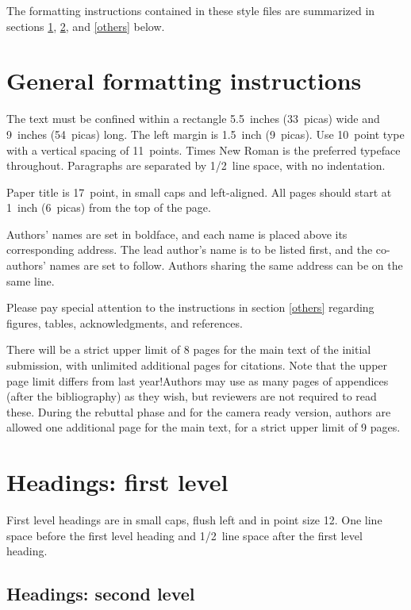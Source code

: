\documentclass{article} %
\begin{document}
The formatting instructions contained in these style files are summarized in
sections \ref{gen_inst}, \ref{headings}, and \ref{others} below.

\section{General formatting instructions}
\label{gen_inst}

The text must be confined within a rectangle 5.5~inches (33~picas) wide and
9~inches (54~picas) long. The left margin is 1.5~inch (9~picas).
Use 10~point type with a vertical spacing of 11~points. Times New Roman is the
preferred typeface throughout. Paragraphs are separated by 1/2~line space,
with no indentation.

Paper title is 17~point, in small caps and left-aligned.
All pages should start at 1~inch (6~picas) from the top of the page.

Authors' names are
set in boldface, and each name is placed above its corresponding
address. The lead author's name is to be listed first, and
the co-authors' names are set to follow. Authors sharing the
same address can be on the same line.

Please pay special attention to the instructions in section \ref{others}
regarding figures, tables, acknowledgments, and references.


There will be a strict upper limit of 8 pages for the main text of the initial submission, with unlimited additional pages for citations. Note that the upper page limit differs from last year!Authors may use as many pages of appendices (after the bibliography) as they wish, but reviewers are not required to read these. During the rebuttal phase and for the camera ready version, authors are allowed one additional page for the main text, for a strict upper limit of 9 pages.

\section{Headings: first level}
\label{headings}

First level headings are in small caps,
flush left and in point size 12. One line space before the first level
heading and 1/2~line space after the first level heading.

\subsection{Headings: second level}
\end{document}

